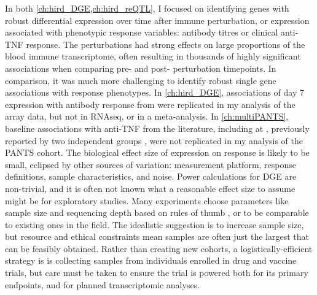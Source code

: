 In both \cref{ch:hird_DGE,ch:hird_reQTL}, I focused on identifying genes with robust differential expression over time after immune perturbation, 
or expression associated with phenotypic response variables: antibody titres or clinical anti-\gls{TNF} response.
The perturbations had strong effects on large proportions of the blood immune transcriptome, 
often resulting in thousands of highly significant associations when comparing pre- and post- perturbation timepoints.
In comparison, it was much more challenging to identify robust single gene associations with response phenotypes.
In \cref{ch:hird_DGE}, associations of day 7 expression with antibody response from \textcite{sobolev2016AdjuvantedInfluenzaH1N1Vaccination} were replicated in my analysis of the array data, but not in \gls{RNAseq}, or in a meta-analysis.
In \cref{ch:multiPANTS}, baseline associations with anti-\gls{TNF} from the literature,
including at , previously reported by two independent groups \autocite{gaujoux2019CellcentredMetaanalysisReveals,verstockt2019LowTREM1Expression}, were not replicated in my analysis of the \gls{PANTS} cohort.
The biological effect size of expression on response is likely to be small, eclipsed by other sources of variation: 
measurement platform, response definitions, sample characteristics, and noise.
Power calculations for \gls{DGE} are non-trivial,
and it is often not known what a reasonable effect size to assume might be for exploratory studies.
Many experiments choose parameters like sample size and sequencing depth based on rules of thumb \autocite{conesa2016SurveyBestPractices}, or to be comparable to existing ones in the field.
The idealistic suggestion is to increase sample size, 
but resource and ethical constraints mean samples are often just the largest that can be feasibly obtained.
Rather than creating new cohorts, a logistically-efficient strategy is is collecting samples from individuals enrolled in drug and vaccine trials,
but care must be taken to ensure the trial is powered both for its primary endpoints,
and for planned transcriptomic analyses.
